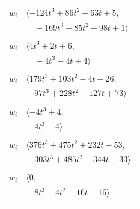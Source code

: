 \documentclass[11pt]{article}
\begin{document}
\begin{longtable}{@{}ll@{}}
$w_i$ & $\langle -124t^{3}+86t^{2}+63t+5,$\\
 & $\quad -169t^{3}-85t^{2}+98t+1\rangle$\\
\addlinespace[2pt]
\multicolumn{2}{@{}p{0.97\textwidth}@{}}{$i=25$, $D_i=2$, $\rho_{ij}$: $7{:}2, \allowbreak 41{:}2, \allowbreak 58{:}1, \allowbreak 63{:}2$}\\
$w_i$ & $\langle 4t^{3}+2t+6,$\\
 & $\quad -4t^{3}-4t+4\rangle$\\
\addlinespace[2pt]
\multicolumn{2}{@{}p{0.97\textwidth}@{}}{$i=26$, $D_i=8$, $\rho_{ij}$: $7{:}1, \allowbreak 14{:}2, \allowbreak 17{:}1, \allowbreak 21{:}1, \allowbreak 28{:}1, \allowbreak 30{:}1, \allowbreak 35{:}1, \allowbreak 37{:}2, \allowbreak 40{:}2, \allowbreak 41{:}2, \allowbreak 47{:}2, \allowbreak 48{:}2$}\\
$w_i$ & $\langle 179t^{3}+103t^{2}-4t-26,$\\
 & $\quad 97t^{3}+228t^{2}+127t+73\rangle$\\
\addlinespace[2pt]
\multicolumn{2}{@{}p{0.97\textwidth}@{}}{$i=27$, $D_i=2$, $\rho_{ij}$: $5{:}1, \allowbreak 8{:}1, \allowbreak 13{:}1, \allowbreak 16{:}1, \allowbreak 36{:}1, \allowbreak 53{:}1, \allowbreak 55{:}2$}\\
$w_i$ & $\langle -4t^{3}+4,$\\
 & $\quad 4t^{3}-4\rangle$\\
\addlinespace[2pt]
\multicolumn{2}{@{}p{0.97\textwidth}@{}}{$i=28$, $D_i=8$, $\rho_{ij}$: $6{:}1, \allowbreak 7{:}1, \allowbreak 9{:}1, \allowbreak 19{:}2, \allowbreak 22{:}1, \allowbreak 26{:}2, \allowbreak 37{:}2, \allowbreak 45{:}2, \allowbreak 50{:}2, \allowbreak 58{:}2$}\\
$w_i$ & $\langle 376t^{3}+475t^{2}+232t-53,$\\
 & $\quad 303t^{3}+485t^{2}+344t+33\rangle$\\
\addlinespace[2pt]
\multicolumn{2}{@{}p{0.97\textwidth}@{}}{$i=29$, $D_i=1$, $\rho_{ij}$: $3{:}1, \allowbreak 4{:}1, \allowbreak 11{:}1, \allowbreak 12{:}2, \allowbreak 13{:}2, \allowbreak 32{:}2, \allowbreak 58{:}1$}\\
$w_i$ & $\langle 0,$\\
 & $\quad 8t^{3}-4t^{2}-16t-16\rangle$\\
\addlinespace[2pt]
\multicolumn{2}{@{}p{0.97\textwidth}@{}}{$i=30$, $D_i=128$, $\rho_{ij}$: $4{:}2, \allowbreak 14{:}2, \allowbreak 16{:}2, \allowbreak 17{:}1, \allowbreak 18{:}2, \allowbreak 19{:}1, \allowbreak 23{:}1, \allowbreak 26{:}2, \allowbreak 31{:}2, \allowbreak 39{:}1, \allowbreak 46{:}1, \allowbreak 50{:}2, \allowbreak 52{:}2, \allowbreak 57{:}2, \allowbreak 58{:}2, \allowbreak 63{:}2$}\\

\end{longtable}
\end{document}
